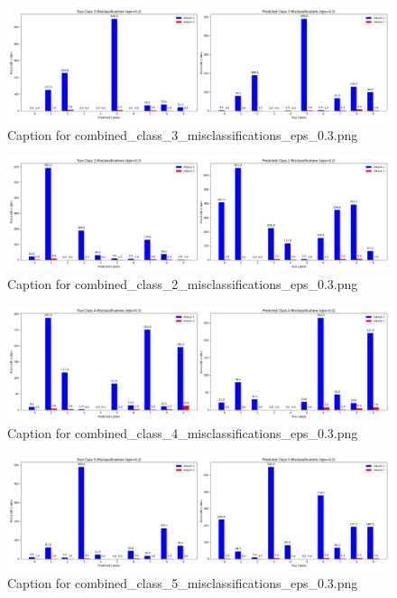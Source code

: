 \documentclass[11pt,onside]{article}
\begin{document}
\begin{figure}[ht]
\centering
\includegraphics[width=1\textwidth]{combined_class_boundary_pgd/combined_class_3_misclassifications_eps_0.3.png}
\caption{Caption for combined_class_3_misclassifications_eps_0.3.png}
\label{fig:combined_class_3_misclassifications_eps_0.3.png}
\end{figure}

\begin{figure}[ht]
\centering
\includegraphics[width=1\textwidth]{combined_class_boundary_pgd/combined_class_2_misclassifications_eps_0.3.png}
\caption{Caption for combined_class_2_misclassifications_eps_0.3.png}
\label{fig:combined_class_2_misclassifications_eps_0.3.png}
\end{figure}

\begin{figure}[ht]
\centering
\includegraphics[width=1\textwidth]{combined_class_boundary_pgd/combined_class_4_misclassifications_eps_0.3.png}
\caption{Caption for combined_class_4_misclassifications_eps_0.3.png}
\label{fig:combined_class_4_misclassifications_eps_0.3.png}
\end{figure}

\begin{figure}[ht]
\centering
\includegraphics[width=1\textwidth]{combined_class_boundary_pgd/combined_class_5_misclassifications_eps_0.3.png}
\caption{Caption for combined_class_5_misclassifications_eps_0.3.png}
\label{fig:combined_class_5_misclassifications_eps_0.3.png}
\end{figure}
\end{document}
